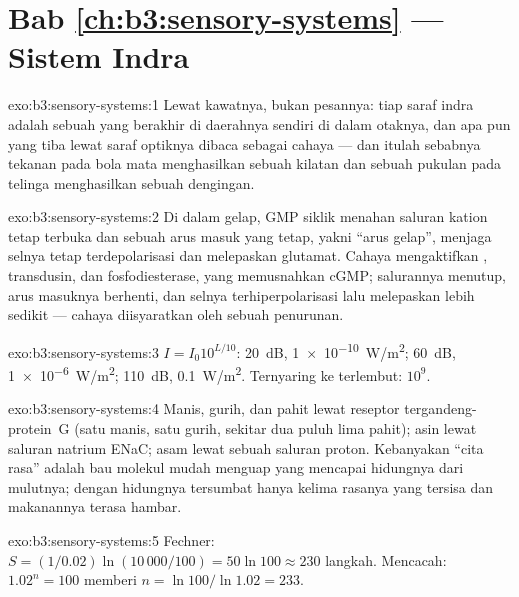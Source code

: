 \section*{Bab \ref{ch:b3:sensory-systems} --- Sistem Indra}

\begin{solution}{exo:b3:sensory-systems:1}
Lewat kawatnya, bukan pesannya: tiap saraf indra adalah sebuah 
yang berakhir di daerahnya sendiri di dalam otaknya, dan apa pun yang tiba lewat
saraf optiknya dibaca sebagai cahaya --- dan itulah sebabnya tekanan pada bola mata
menghasilkan sebuah kilatan dan sebuah pukulan pada telinga menghasilkan sebuah dengingan.
\end{solution}

\begin{solution}{exo:b3:sensory-systems:2}
Di dalam gelap, GMP siklik menahan saluran kation tetap terbuka dan sebuah arus masuk
yang tetap, yakni ``arus gelap'', menjaga selnya tetap terdepolarisasi dan melepaskan glutamat.
Cahaya mengaktifkan , transdusin, dan fosfodiesterase, yang
memusnahkan cGMP; salurannya menutup, arus masuknya berhenti, dan
selnya terhiperpolarisasi lalu melepaskan lebih sedikit --- cahaya diisyaratkan oleh sebuah
penurunan.
\end{solution}

\begin{solution}{exo:b3:sensory-systems:3}
$I = I_{0}10^{L/10}$: \qty{20}{dB}, \qty{1e-10}{W/m^2}; \qty{60}{dB},
\qty{1e-6}{W/m^2}; \qty{110}{dB}, \qty{0.1}{W/m^2}. Ternyaring ke terlembut:
$10^{9}$.
\end{solution}

\begin{solution}{exo:b3:sensory-systems:4}
Manis, gurih, dan pahit lewat reseptor tergandeng-protein~G (satu
manis, satu gurih, sekitar dua puluh lima pahit); asin lewat saluran natrium
ENaC; asam lewat sebuah saluran proton. Kebanyakan ``cita rasa'' adalah
bau molekul mudah menguap yang mencapai hidungnya dari mulutnya; dengan
hidungnya tersumbat hanya kelima rasanya yang tersisa dan makanannya terasa hambar.
\end{solution}

\begin{solution}{exo:b3:sensory-systems:5}
Fechner: $S = (1/0.02)\ln(10\,000/100) = 50\ln 100 \approx 230$ langkah.
Mencacah: $1.02^{n} = 100$ memberi $n = \ln 100/\ln 1.02 = 233$.
\end{solution}

